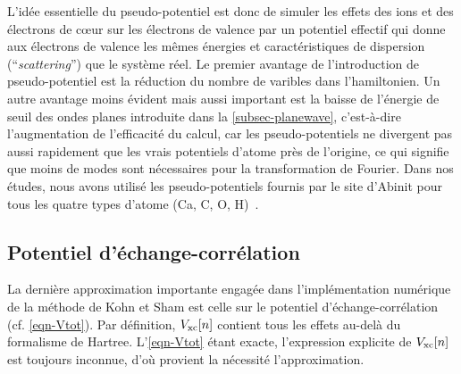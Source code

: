 L'idée essentielle du pseudo-potentiel est donc de simuler les effets des ions et des électrons de cœur
sur les électrons de valence par un potentiel effectif qui donne aux électrons de valence
les mêmes énergies et caractéristiques de dispersion (``\textit{scattering}'') que le système réel.
Le premier avantage de l'introduction de pseudo-potentiel est la réduction du nombre de varibles dans l'hamiltonien.
Un autre avantage moins évident mais aussi important est la baisse de l'énergie de seuil des ondes planes introduite dans la \cref{subsec-planewave},
c'est-à-dire l'augmentation de l'efficacité du calcul, car les pseudo-potentiels ne divergent pas aussi rapidement que les vrais potentiels d'atome près de l'origine,
ce qui signifie que moins de modes sont nécessaires pour la transformation de Fourier.
Dans nos études, nous avons utilisé les pseudo-potentiels fournis par le site d'Abinit pour tous les
quatre types d'atome (Ca, C, O, H)~\cite{Pseudo}.

\subsection{Potentiel d'échange-corrélation}
\label{subsec-xc}
La dernière approximation importante engagée dans l'implémentation numérique
de la méthode de Kohn et Sham est celle sur le potentiel d'échange-corrélation (cf. \cref{eqn-Vtot}).
Par définition, $V_{\textnormal{xc}}[n]$ contient tous les effets au-delà du formalisme de Hartree.
L'\cref{eqn-Vtot} étant exacte, l'expression explicite de $V_{\textnormal{xc}}[n]$ est toujours inconnue,
d'où provient la nécessité l'approximation.

